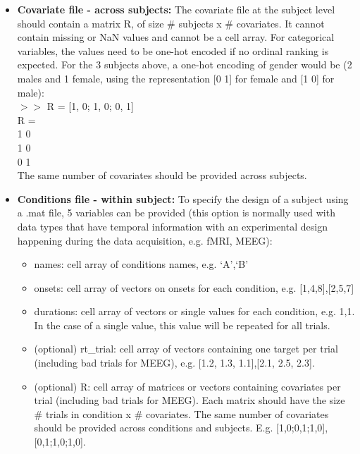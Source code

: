 \begin{itemize}
\begin{itemize}
\end{itemize}

\item \textbf{Covariate file - across subjects:} The covariate file at the subject level should contain a matrix R, of size \# subjects x \# covariates. It cannot contain missing or NaN values and cannot be a cell array. For categorical variables, the values need to be one-hot encoded if no ordinal ranking is expected. For the 3 subjects above, a one-hot encoding of gender would be (2 males and 1 female,  using the representation [0 1] for female and [1 0] for male):
\\

$>>$ R = [1, 0; 1, 0; 0, 1]
\\

R = \\
1 0 \\
1 0 \\
0 1 \\

The same number of covariates should be provided across subjects.

\item \textbf{Conditions file - within subject:} To specify the design of a subject using a .mat file, 5 variables can be provided (this option is normally used with data types that have temporal information with an experimental design happening during the data acquisition, e.g. fMRI, MEEG):

\begin{itemize}
\item names: cell array of conditions names, e.g. {`A',`B'}
\item onsets: cell array of vectors on onsets for each condition, e.g. {[1,4,8],[2,5,7]}
\item durations: cell array of vectors or single values for each condition, e.g. {1,1}. In the case of a single value, this value will be repeated for all trials.
\item (optional) rt\_trial: cell array of vectors containing one target per trial (including bad trials for MEEG), e.g. {[1.2, 1.3, 1.1],[2.1, 2.5, 2.3]}.
\item (optional) R: cell array of matrices or vectors containing covariates per trial (including bad trials for MEEG). Each matrix should have the size \# trials in condition x \# covariates. The same number of covariates should be provided across conditions and subjects. E.g. {[1,0;0,1;1,0],[0,1;1,0;1,0]}.

\end{itemize}

\end{itemize}

